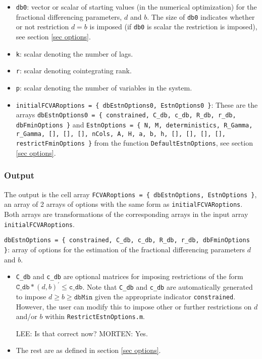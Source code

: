 \documentclass[12pt]{article}
\begin{document}
\begin{itemize}

\item  \texttt{db0}: vector or scalar of starting values (in the numerical optimization) for the fractional differencing parameters, $d$ and $b$. The size of \texttt{db0} indicates whether or not restriction $d=b$ is imposed (if \texttt{db0} is scalar the restriction is imposed), see section \ref{sec options}.

\item \texttt{k}: scalar denoting the number of lags.

\item \texttt{r}: scalar denoting cointegrating rank.

\item \texttt{p}: scalar denoting the number of variables in the system.

\item \texttt{initialFCVARoptions = \{ dbEstnOptions0, EstnOptions0 \}}: These are the arrays \texttt{dbEstnOptions0 = \{ constrained, C\_db, c\_db, R\_db, r\_db, dbFminOptions \}} and \texttt{EstnOptions = \{ N, M, deterministics, R\_Gamma, r\_Gamma, [], [], [], nCols, A, H, a, b, h, [], [], [], [], restrictFminOptions \}} from the function \texttt{DefaultEstnOptions}, see section \ref{sec options}.

\end{itemize}


\subsubsection*{Output}

The output is the cell array \texttt{FCVARoptions = \{ dbEstnOptions, EstnOptions \}}, an array of 2 arrays of options with the same form as \texttt{initialFCVARoptions}. Both arrays are transformations of the corresponding arrays in the input array \texttt{initialFCVARoptions}.

\bigskip

\noindent \texttt{dbEstnOptions = \{ constrained, C\_db, c\_db, R\_db, r\_db, dbFminOptions \}}: array of options for the estimation of the fractional differencing parameters $d$ and $b$. 

\begin{itemize}

\item \texttt{C\_db} and \texttt{c\_db} are optional matrices for imposing restrictions of the form $\texttt{C\_db} * (d,b) ^{\prime} \leq \texttt{c\_db}$. Note that \texttt{C\_db} and \texttt{c\_db} are automatically generated to impose $d \geq b \geq \texttt{dbMin}$ given the appropriate indicator \texttt{constrained}. However, the user can modify this to impose other or further restrictions on $d$ and/or $b$ within \texttt{RestrictEstnOptions.m}.

LEE: Is that correct now?
MORTEN: Yes.

\item The rest are as defined in section \ref{sec options}.

\end{itemize}
\end{document}

